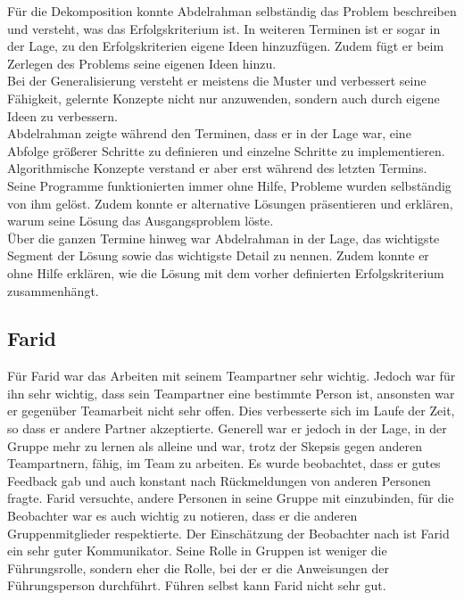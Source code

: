 Für die Dekomposition konnte Abdelrahman selbständig das Problem beschreiben und versteht, was das Erfolgskriterium ist. In weiteren Terminen ist er sogar in der Lage, zu den Erfolgskriterien eigene Ideen hinzuzfügen. Zudem fügt er beim Zerlegen des Problems seine eigenen Ideen hinzu.\\
Bei der Generalisierung versteht er meistens die Muster und verbessert seine Fähigkeit, gelernte Konzepte nicht nur anzuwenden, sondern auch durch eigene Ideen zu verbessern.\\
Abdelrahman zeigte während den Terminen, dass er in der Lage war, eine Abfolge größerer Schritte zu definieren und einzelne Schritte zu implementieren. Algorithmische Konzepte verstand er aber erst während des letzten Termins.\\
Seine Programme funktionierten immer ohne Hilfe, Probleme wurden selbständig von ihm gelöst. Zudem konnte er alternative Lösungen präsentieren und erklären, warum seine Lösung das Ausgangsproblem löste.\\
Über die ganzen Termine hinweg war Abdelrahman in der Lage, das wichtigste Segment der Lösung sowie das wichtigste Detail zu nennen. Zudem konnte er ohne Hilfe erklären, wie die Lösung mit dem vorher definierten Erfolgskriterium zusammenhängt.\\

\subsection*{Farid}
Für Farid war das Arbeiten mit seinem Teampartner sehr wichtig. Jedoch war für ihn sehr wichtig, dass sein Teampartner eine bestimmte Person ist, ansonsten war er gegenüber Teamarbeit nicht sehr offen. Dies verbesserte sich im Laufe der Zeit, so dass er andere Partner akzeptierte. Generell war er jedoch in der Lage, in der Gruppe mehr zu lernen als alleine und war, trotz der Skepsis gegen anderen Teampartnern, fähig, im Team zu arbeiten. Es wurde beobachtet, dass er gutes Feedback gab und auch konstant nach Rückmeldungen von anderen Personen fragte. Farid versuchte, andere Personen in seine Gruppe mit einzubinden, für die Beobachter war es auch wichtig zu notieren, dass er die anderen Gruppenmitglieder respektierte. Der Einschätzung der Beobachter nach ist Farid ein sehr guter Kommunikator. Seine Rolle in Gruppen ist weniger die Führungsrolle, sondern eher die Rolle, bei der er die Anweisungen der Führungsperson durchführt. Führen selbst kann Farid nicht sehr gut.\\

